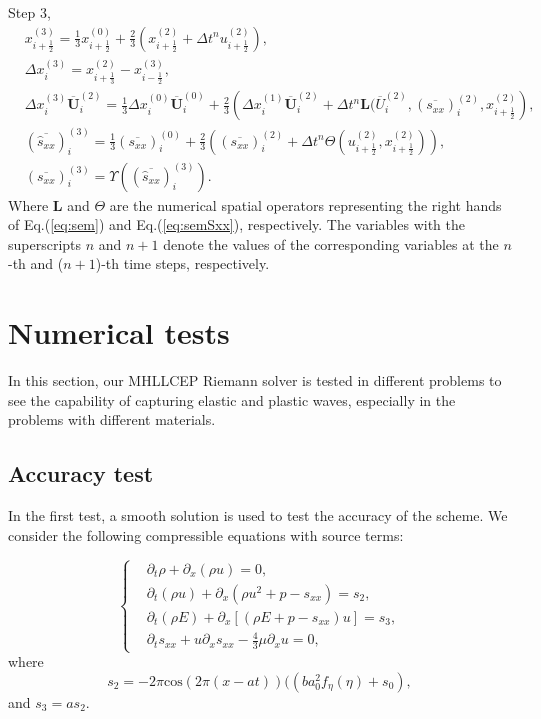 \documentclass[review]{elsarticle}
\begin{document}
Step 3,
\begin{equation}
  \begin{aligned}
    & x_{i+\frac{1}{2}}^{(3)} = \frac{1}{3} x_{i+\frac{1}{2}}^{(0)}+\frac{2}{3} \left( x_{i+\frac{1}{2}}^{(2)}+\Delta t^n u_{i+\frac{1}{2}}^{(2)}\right),\\
    & \Delta x_i^{(3)} =  x_{i+\frac{1}{3}}^{(2)}- x_{i-\frac{1}{2}}^{(3)},\\
    & \Delta x_i^{(3)} \overline{\mathbf{U}}_i^{(2)}  = \frac{1}{3} \Delta x_i^{(0)} \overline{\mathbf{U}}_i^{(0)}+ \frac{2}{3} \left(  \Delta x_i^{(1)} \overline{\mathbf{U}}_i^{(2)} + \Delta t^n \mathbf{L}(\overline{U}_i^{(2)}, (\overline{s_{xx}})_i^{(2)}, x_{i+\frac{1}{2}}^{(2)} \right),\\
    & (\overline{\hat{s}_{xx}})_i^{(3)} =\frac{1}{3} (\overline{s_{xx}})_i^{(0)} + \frac{2}{3} \left(  (\overline{s_{xx}})_i^{(2)}+\Delta t^ n \varTheta (u_{i+\frac{1}{2}}^{(2)}, x_{i+\frac{1}{2}}^{(2)})\right),\\
  & (\overline{s_{xx}})_i^{(3)} = \Upsilon((\overline{\hat{s}_{xx}})_i^{(3)}).
\end{aligned}
\end{equation}
Where $\mathbf{L}$ and $\varTheta$ are the numerical spatial operators representing the right hands of Eq.(\ref{eq:sem}) and Eq.(\ref{eq:semSxx}), respectively. The variables with the superscripts $n$ and $n+1$ denote the values of the corresponding variables at the $n$-th and ($n+1$)-th time steps, respectively.

\section{Numerical tests}
In this section, our MHLLCEP Riemann solver is tested  in different problems to see the capability of  capturing elastic and plastic waves, especially in the problems  with different materials.

\subsection{Accuracy test}
In the first test, a smooth solution is used to test the accuracy of the scheme.  We consider the following compressible equations with source terms:

\begin{equation}
  \left\{
  \begin{aligned}
&	\partial_t \rho + \partial_x(\rho u) = 0, \\
&	\partial_t (\rho u) + \partial_x(\rho u^2 + p -s_{xx}) = s_2, \\
&  \partial_t (\rho E) + \partial_x[(\rho E + p -s_{xx})u] = s_3, \\
& \partial_t s_{xx} + u\partial_x s_{xx} - \frac{4}{3}\mu \partial_x u =0,
\end{aligned}
\right.
\end{equation}
where  
$$s_2 = -2\pi \text{cos}(2\pi (x-at))((ba_0^2f_\eta(\eta)+s_0),$$
  and $ s_3 = as_2 .$
\end{document}
